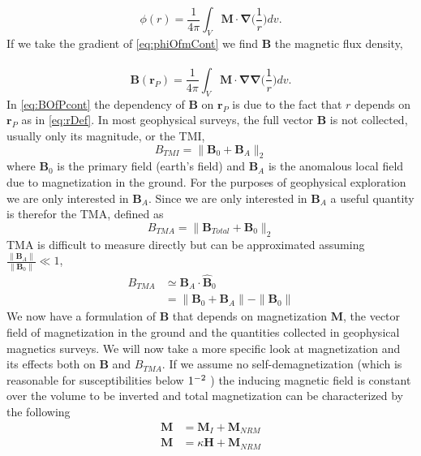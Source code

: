 \begin{equation}\label{eq:phiOfmCont}
\phi( r) = \frac{1}{4\pi}\int_V\mathbf M\cdot \mathbf{\nabla}\Big(\frac{1}{r}\Big)dv.
\end{equation}
If we take the gradient of \autoref{eq:phiOfmCont} we find $\mathbf B$ the magnetic flux density,\\\\
\begin{equation}\label{eq:BOfPcont}
\mathbf B (\mathbf r_P) = \frac{1}{4\pi}\int_V\mathbf M\cdot \mathbf{\nabla}\mathbf{\nabla}\Big(\frac{1}{r}\Big)dv.
\end{equation}
In \autoref{eq:BOfPcont} the dependency of $\mathbf B$ on $\mathbf r_P$ is due to the fact that $r$ depends on $\mathbf r_P$ as in \autoref{eq:rDef}. In most geophysical surveys, the full vector $\mathbf B$ is not collected, usually only its magnitude, or the \ac{TMI},
\begin{equation}\label{eq:TMI}
B_{TMI} = \| \mathbf B_0 + \mathbf B_A\|_2
\end{equation}
where $\mathbf B_0$ is the primary field (earth's field) and $\mathbf B_A$ is the anomalous local field due to magnetization in the ground. For the purposes of geophysical exploration we are only interested in $\mathbf B_A$. Since we are only interested in $\mathbf B_A$ a useful quantity is therefor the \ac{TMA}, defined as
\begin{equation}\label{eq:TMA}
B_{TMA} = \| \mathbf B_{Total} + \mathbf B_0\|_2
\end{equation}
\ac{TMA} is difficult to measure directly but can be approximated assuming $\frac{\|\mathbf B_A\|}{\|\mathbf B_0\|} \ll 1$,
\begin{align}\label{eq:TMAaprox}
B_{TMA} &\simeq \mathbf B_A\cdot \hat{\mathbf B}_0\\
&=\|\mathbf B_0+\mathbf B_A\| - \|\mathbf B_0\|
\end{align}
We now have a formulation of $\mathbf B$ that depends on magnetization $\mathbf M$, the vector field of magnetization in the ground and the quantities collected in geophysical magnetics surveys. We will now take a more specific look at magnetization and its effects both on $\mathbf B$ and $B_{TMA}$. If we assume no self-demagnetization (which is reasonable for susceptibilities below $1\time10^{-2}$ \cite{lelievre2006magnetic}) the inducing magnetic field is constant over the volume to be inverted and total magnetization can be characterized by the following
\begin{align} \label{eq:magnetization}
\textbf{M} &= \mathbf M_I + \textbf{M}_{NRM}\\
\textbf{M} &= \kappa\textbf{H} + \textbf{M}_{NRM}
\end{align}
